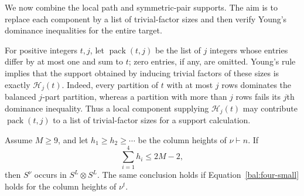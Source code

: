 We now combine the local path and symmetric-pair supports. The aim is
to replace each component by a list of trivial-factor sizes and then
verify Young's dominance inequalities for the entire target.

For positive integers $t,j$, let $\operatorname{pack}(t,j)$
be the list of $j$ integers whose entries differ by at most one
and sum to $t$; zero entries, if any, are omitted.  Young's rule
implies that the support obtained by inducing trivial factors of
these sizes is exactly $\mathcal H_j(t)$.  Indeed, every partition
of $t$ with at most $j$ rows dominates the balanced $j$-part
partition, whereas a partition with more than $j$ rows fails
its $j$th dominance inequality.  Thus a local component supplying
$\mathcal H_j(t)$ may contribute $\operatorname{pack}(t,j)$
to a list of trivial-factor sizes for a support calculation.

\begin{proposition}
\label{prop:balance-four}
Assume $M\ge9$, and let $h_1\ge h_2\ge\cdots$ be the column
heights of $\nu\vdash n$.  If
\begin{equation}
 \sum_{i=1}^4 h_i\le2M-2,
 \label{bal:four-small}
\end{equation}
then $S^\nu$ occurs in $S^L\otimes S^L$.
The same conclusion holds if Equation~\eqref{bal:four-small}
holds for the column heights of $\nu^t$.
\end{proposition}

